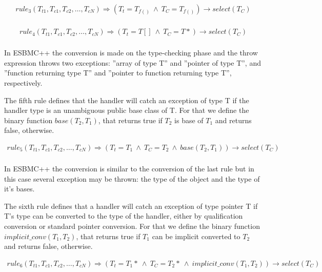 \documentclass[a4paper]{llncs}
\begin{document}
{\[\begin{array}{ll}
rule_3(T_{t1},T_{c1}, T_{c2}, \ldots, T_{cN}) \Longrightarrow
  (T_{t} = T_{f()} \: \wedge \: T_{C} = T_{f()})\rightarrow select(T_{C}) \\
\end{array}\]

\[\begin{array}{ll}
rule_4(T_{t1},T_{c1}, T_{c2}, \ldots, T_{cN}) \Longrightarrow
  (T_{t} = T[] \: \wedge \: T_{C} = T*)\rightarrow select(T_{C}) \\
\end{array}\]

In ESBMC++ the conversion is made on the type-checking phase and the throw
expression throws two exceptions: ''array of type T'' and ''pointer of type
T'', and ''function returning type T'' and ''pointer to function returning
type T'', respectively.

The fifth rule defines that the handler will catch an exception of type T
if the handler type is an unambiguous public base class of T.
For that we define the binary function $base(T_{2}, T_{1})$, that returns
true if $T_{2}$ is base of $T_{1}$ and returns false, otherwise.

\[\begin{array}{ll}
rule_5(T_{t1},T_{c1}, T_{c2}, \ldots, T_{cN}) \Longrightarrow
  (T_{t} = T_{1} \: \wedge \: T_{C} = T_{2} \: \wedge \: base(T_{2}, T_{1}))\rightarrow select(T_{C}) \\
\end{array}\]

In ESBMC++ the conversion is similar to the conversion of the last rule
but in this case several exception may be thrown: the type of the object
and the type of it's bases.

The sixth rule defines that a handler will catch an exception of type
pointer T if T's type can be converted to the type of the handler, either by
qualification conversion or standard pointer conversion.
For that we define the binary function $implicit\_conv(T_{1}, T_{2})$, that
returns true if $T_{1}$ can be implicit converted to $T_{2}$ and returns false,
otherwise.

\[\begin{array}{ll}
rule_6(T_{t1},T_{c1}, T_{c2}, \ldots, T_{cN}) \Longrightarrow
  (T_{t} = T_{1}* \: \wedge \: T_{C} = T_{2}* \: \wedge \: implicit\_conv(T_{1}, T_{2}))\rightarrow select(T_{C}) \\
\end{array}\]

}
\end{document}
